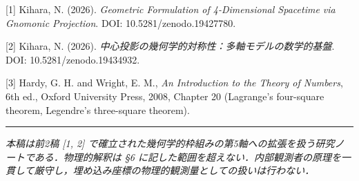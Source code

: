 \documentclass[a4paper,11pt]{ltjsarticle}
\theoremstyle{definition}
\begin{document}
{[}1{]} Kihara, N. (2026). \emph{Geometric Formulation of 4-Dimensional Spacetime via Gnomonic Projection}. DOI: 10.5281/zenodo.19427780.

{[}2{]} Kihara, N. (2026). \emph{中心投影の幾何学的対称性：多軸モデルの数学的基盤}. DOI: 10.5281/zenodo.19434932.

{[}3{]} Hardy, G. H. and Wright, E. M., \emph{An Introduction to the Theory of Numbers}, 6th ed., Oxford University Press, 2008, Chapter 20 (Lagrange's four-square theorem, Legendre's three-square theorem).

\begin{center}\rule{0.5\linewidth}{0.5pt}\end{center}

\emph{本稿は前2稿 {[}1, 2{]} で確立された幾何学的枠組みの第5軸への拡張を扱う研究ノートである．物理的解釈は §6 に記した範囲を超えない．内部観測者の原理を一貫して厳守し，埋め込み座標の物理的観測量としての扱いは行わない．}
\end{document}
